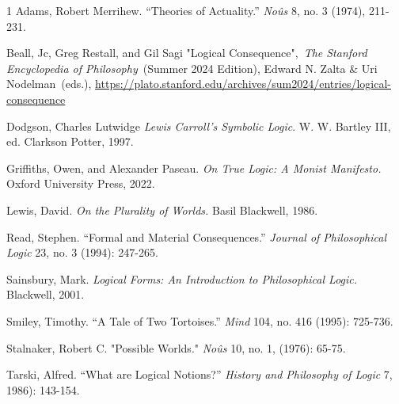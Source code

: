 
\begin{hangparas}{\hangingindent}{1}
Adams, Robert Merrihew. ``Theories of Actuality.'' \emph{Noûs} 8, no. 3
(1974), 211-231.

Beall, Jc, Greg Restall, and Gil Sagi "Logical Consequence",~\emph{The
Stanford Encyclopedia of Philosophy~}(Summer 2024 Edition), Edward N.
Zalta \& Uri Nodelman~(eds.),
\newline
\url{https://plato.stanford.edu/archives/sum2024/entries/logical-consequence}

Dodgson, Charles Lutwidge \emph{Lewis Carroll's Symbolic Logic}. W. W.
Bartley III, ed. Clarkson Potter, 1997.

Griffiths, Owen, and Alexander Paseau. \emph{On True Logic: A
Monist Manifesto.} Oxford University Press, 2022.

Lewis, David. \emph{On the Plurality of Worlds.} Basil Blackwell, 1986.

Read, Stephen. ``Formal and Material Consequences.'' \emph{Journal of Philosophical Logic} 23,
no. 3 (1994): 247-265.

Sainsbury, Mark. \emph{Logical Forms: An
Introduction to Philosophical Logic.} Blackwell, 2001.

Smiley, Timothy. ``A Tale of Two Tortoises.'' \emph{Mind} 104, no. 416 (1995):
725-736.

Stalnaker, Robert C. "Possible Worlds." \emph{Noûs} 10, no. 1, (1976): 65-75.

Tarski, Alfred. ``What are Logical Notions?''
\emph{History and Philosophy of Logic} 7, 1986): 143-154.
\end{hangparas}
